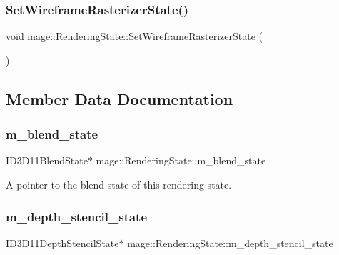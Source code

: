 \hypertarget{structmage_1_1_rendering_state_a392b339b24950c71bfc7285bcca5eacf}{}\label{structmage_1_1_rendering_state_a392b339b24950c71bfc7285bcca5eacf} 
\subsubsection{\texorpdfstring{Set\+Wireframe\+Rasterizer\+State()}{SetWireframeRasterizerState()}}
{\footnotesize\ttfamily void mage\+::\+Rendering\+State\+::\+Set\+Wireframe\+Rasterizer\+State (\begin{DoxyParamCaption}{ }\end{DoxyParamCaption})}



\subsection{Member Data Documentation}
\hypertarget{structmage_1_1_rendering_state_ab08e5f63a1bd463ce6029eaaf3526ae4}{}\label{structmage_1_1_rendering_state_ab08e5f63a1bd463ce6029eaaf3526ae4} 
\subsubsection{\texorpdfstring{m\+\_\+blend\+\_\+state}{m\_blend\_state}}
{\footnotesize\ttfamily I\+D3\+D11\+Blend\+State$\ast$ mage\+::\+Rendering\+State\+::m\+\_\+blend\+\_\+state\hspace{0.3cm}{\ttfamily [private]}}

A pointer to the blend state of this rendering state. \hypertarget{structmage_1_1_rendering_state_a2428412ad160c0d4dd2538c3a9cc863f}{}\label{structmage_1_1_rendering_state_a2428412ad160c0d4dd2538c3a9cc863f} 
\subsubsection{\texorpdfstring{m\+\_\+depth\+\_\+stencil\+\_\+state}{m\_depth\_stencil\_state}}
{\footnotesize\ttfamily I\+D3\+D11\+Depth\+Stencil\+State$\ast$ mage\+::\+Rendering\+State\+::m\+\_\+depth\+\_\+stencil\+\_\+state\hspace{0.3cm}{\ttfamily [private]}}

